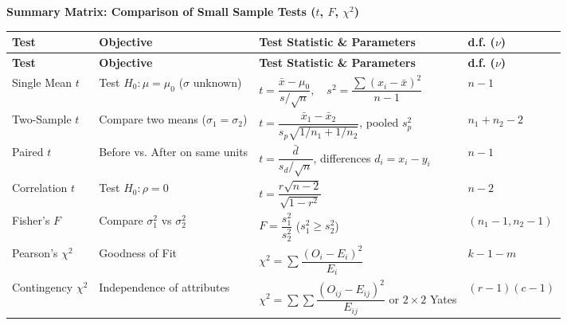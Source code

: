 \documentclass[12pt,a4paper]{article}
\renewcommand{\arraystretch}{1.45}
\begin{document}
\begingroup
\par\smallskip\noindent \textbf{Summary Matrix: Comparison of Small Sample Tests ($t$, $F$, $\chi^2$)}\par\nobreak
\par\vspace{1pt}
\begingroup
\setlength{\tabcolsep}{3.5pt}
\setlength{\extrarowheight}{1.5pt}
\renewcommand{\arraystretch}{1.22}
\begingroup
\setlength{\LTleft}{0pt}
\setlength{\LTright}{0pt}
\begin{longtable}{|B{2.5cm}|B{2.7cm}|>{\small\raggedright\arraybackslash}m{\dimexpr(\linewidth-2.5cm-2.7cm-2.2cm-8\arrayrulewidth)/1\relax}|>{\small\centering\arraybackslash}m{2.2cm}|}
\hline
\textbf{Test} & \textbf{Objective} & \textbf{Test Statistic \& Parameters} & \textbf{d.f. ($\nu$)} \\
\hline
\endfirsthead
\hline
\textbf{Test} & \textbf{Objective} & \textbf{Test Statistic \& Parameters} & \textbf{d.f. ($\nu$)} \\
\hline
\endhead
Single Mean $t$ & Test $H_0: \mu = \mu_0$ ($\sigma$ unknown) & $t = \dfrac{\bar{x} - \mu_0}{s / \sqrt{n}}, \quad s^2 = \dfrac{\sum(x_i - \bar{x})^2}{n - 1}$ & $n - 1$ \\
\hline
Two-Sample $t$ & Compare two means ($\sigma_1 = \sigma_2$) & $t = \dfrac{\bar{x}_1 - \bar{x}_2}{s_p\sqrt{1/n_1 + 1/n_2}}$, pooled $s_p^2$ & $n_1 + n_2 - 2$ \\
\hline
Paired $t$ & Before vs. After on same units & $t = \dfrac{\bar{d}}{s_d / \sqrt{n}}$, differences $d_i = x_i - y_i$ & $n - 1$ \\
\hline
Correlation $t$ & Test $H_0: \rho = 0$ & $t = \dfrac{r\sqrt{n-2}}{\sqrt{1 - r^2}}$ & $n - 2$ \\
\hline
Fisher's $F$ & Compare $\sigma_1^2$ vs $\sigma_2^2$ & $F = \dfrac{s_1^2}{s_2^2}$ ($s_1^2 \ge s_2^2$) & $(n_1 - 1, n_2 - 1)$ \\
\hline
Pearson's $\chi^2$ & Goodness of Fit & $\chi^2 = \sum \dfrac{(O_i - E_i)^2}{E_i}$ & $k - 1 - m$ \\
\hline
Contingency $\chi^2$ & Independence of attributes & $\chi^2 = \sum \sum \dfrac{(O_{ij} - E_{ij})^2}{E_{ij}}$ or $2 \times 2$ Yates & $(r - 1)(c - 1)$ \\
\hline
\end{longtable}
\endgroup\par
\endgroup
\endgroup
\end{document}
